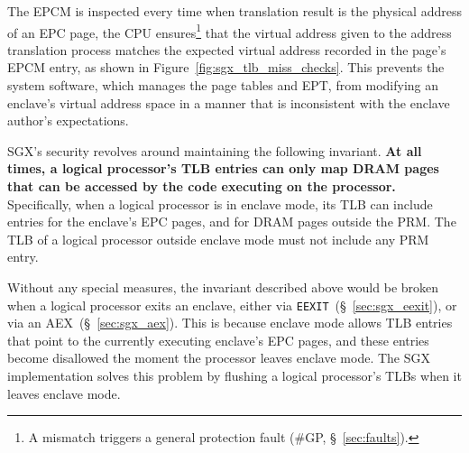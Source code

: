 The EPCM is inspected every time when
translation result is the physical
address of an EPC page, the CPU ensures\footnote{A mismatch triggers a general
protection fault (\#GP, \S~\ref{sec:faults}).} that the virtual address given
to the address translation process matches the expected virtual address
recorded in the page's EPCM entry, as shown in
Figure~\ref{fig:sgx_tlb_miss_checks}. This prevents the system software, which
manages the page tables and EPT, from modifying an enclave's virtual address
space in a manner that is inconsistent with the enclave author's expectations.


SGX's security revolves around maintaining the following
invariant. \textbf{At all times, a logical processor's TLB
entries can only map DRAM pages that can be accessed by the code executing on
the processor.} Specifically, when a logical processor is in enclave mode, its
TLB can include entries for the enclave's EPC pages, and for DRAM pages outside
the PRM. The TLB of a logical processor outside enclave mode must not include
any PRM entry.

Without any special measures, the invariant described above would be broken
when a logical processor exits an enclave, either via
\texttt{EEXIT}~(\S~\ref{sec:sgx_eexit}), or via an AEX~(\S~\ref{sec:sgx_aex}).
This is because enclave mode allows TLB entries that point to the currently
executing enclave's EPC pages, and these entries become disallowed the moment
the processor leaves enclave mode. The SGX implementation solves this problem
by flushing a logical processor's TLBs when it leaves enclave mode.
